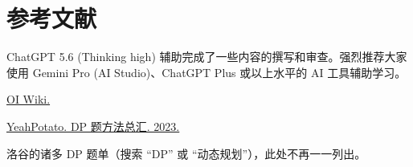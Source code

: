 \chapter*{参考文献}


    ChatGPT 5.6 (Thinking high) 辅助完成了一些内容的撰写和审查。强烈推荐大家使用 Gemini Pro (AI Studio)、ChatGPT Plus 或以上水平的 AI 工具辅助学习。

    \href{http://oiwiki.com}{OI Wiki.}

    \href{https://www.luogu.com.cn/article/ki71nw88}{YeahPotato. DP 题方法总汇. 2023.}

    洛谷的诸多 DP 题单（搜索 “DP” 或 “动态规划”），此处不再一一列出。

  
    